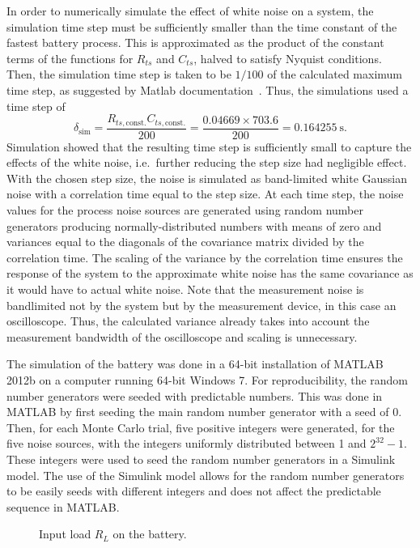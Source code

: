 \documentclass[../zhang_thesis.tex]{subfiles}
\begin{document}
In order to numerically simulate the effect of white noise on a system, the simulation time step must be sufficiently smaller than the time constant of the fastest battery process. This is approximated as the product of the constant terms of the functions for $R_{ts}$ and $C_{ts}$, halved to satisfy Nyquist conditions. Then, the simulation time step is taken to be $1/100$ of the calculated maximum time step, as suggested by Matlab documentation~\cite{matlab}. Thus, the simulations used a time step of
\begin{equation}
    \delta_\text{sim} = \frac{R_{ts,\text{const.}}C_{ts,\text{const.}}}{200} = \frac{0.04669\times 703.6}{200} = 0.164255~\text{s}.
\end{equation}
Simulation showed that the resulting time step is sufficiently small to capture the effects of the white noise, i.e.\ further reducing the step size had negligible effect. With the chosen step size, the noise is simulated as band-limited white Gaussian noise with a correlation time equal to the step size. At each time step, the noise values for the process noise sources are generated using random number generators producing normally-distributed numbers with means of zero and variances
equal to the diagonals of the covariance matrix divided by the correlation time. The scaling of the variance by the correlation time ensures the response of the system to the approximate white noise has the same covariance as it would have to actual white noise. Note that the measurement noise is bandlimited not by the system but by the measurement device, in this case an oscilloscope. Thus, the calculated variance already takes into account the measurement bandwidth of the oscilloscope and
scaling is unnecessary.

The simulation of the battery was done in a 64-bit installation of MATLAB 2012b on a computer running 64-bit Windows 7. For reproducibility, the random number generators were seeded with predictable numbers. This was done in MATLAB by first seeding the main random number generator with a seed of 0. Then, for each Monte Carlo trial, five positive integers were generated, for the five noise sources, with the integers uniformly distributed between 1 and $2^{32}-1$. These integers were used to seed the random number generators in a Simulink model. The use of the Simulink model allows for the
random number generators to be easily seeds with different integers and does not affect the predictable sequence in MATLAB.

\begin{figure}[htb]
\centering

\caption{Input load $R_L$ on the battery.}
\label{fig:input}
\end{figure}
\end{document}
